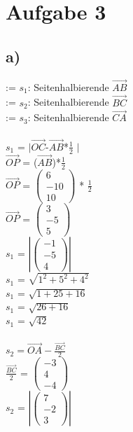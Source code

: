 \documentclass{article}
\begin{document}
	\section*{Aufgabe 3}
	\subsection*{a)}
	:= $s_1$: Seitenhalbierende $\vec{AB}$ \\
	:= $s_2$: Seitenhalbierende $\vec{BC}$ \\
	:= $s_3$: Seitenhalbierende $\vec{CA}$ \\ \\
	$s_1$ = $|$$\vec{OC}$-$\vec{AB}$*$\frac{1}{2}$ $|$ \\
	$\vec{OP}$ = ($\vec{AB}$)*$\frac{1}{2}$ \\
	$\vec{OP}$ =
	$
	\left(\begin{array}{c}
	6 \\ -10 \\ 10
	\end{array}\right)
	$ * $\frac{1}{2}$ \\
	$\vec{OP}$ =
	$
	\left(\begin{array}{c}
	3 \\ -5 \\ 5
	\end{array}\right)
	$  \\
	$s_1$ = 
	$
	\left|\left(\begin{array}{c}
		-1 \\ -5 \\ 4
	\end{array}\right)\right|
	$ \\
	$s_1$ = $\sqrt{1^2 + 5^2 + 4^2}$ \\
	$s_1$ = $\sqrt{1 + 25 + 16}$ \\
	$s_1$ = $\sqrt{26 + 16}$ \\
	$s_1$ = $\sqrt{42}$ \\ \\
	$s_2 = \vec{OA} - \frac{\vec{BC}}{2}$  \\
	$\frac{\vec{BC}}{2}$ = 
	$\left(\begin{array}{c}
	-3 \\ 4 \\ -4
	\end{array}\right)$ \\
	$s_2$ = 
	$\left|\left( \begin{array}{c}
	7 \\ -2 \\ 3
	\end{array} \right)\right|$ \\
$$
\end{document}
